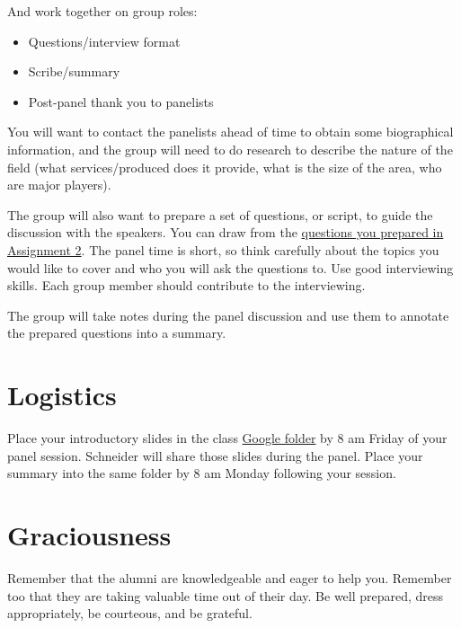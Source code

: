 \documentclass[11pt]{article}
\begin{document}
And work together on group roles:
\begin{itemize}
\item Questions/interview format
\item Scribe/summary
\item Post-panel thank you to panelists
\end{itemize}

You will want to contact the panelists ahead of time to obtain some biographical information, and the group will need to do research to describe the nature of the field (what services/produced does it provide, what is the size of the area, who are major players).

The group will also want to prepare a set of questions, or script, to guide the discussion with the speakers. You can draw from the \href{https://docs.google.com/document/d/1eUqnfeW1NTqqTqEzBxjCo6u20dFwN1kRAMNXPG9ioL0/edit?usp=sharing}{questions you prepared in Assignment 2}. The panel time is short, so think carefully about the topics you would like to cover and who you will ask the questions to. Use good interviewing skills. Each group member should  contribute to the interviewing. 

The group will take notes during the panel discussion and use them to annotate the prepared questions into a summary.

\section{Logistics}
\label{sec:orgfa18aae}
Place your introductory slides in the class \href{https://drive.google.com/drive/folders/1tC6bTIxFh\_fRfUk-FdwIHLAv8rMCMje3?usp=sharing}{Google folder} by 8 am Friday of your panel session. Schneider will share those slides during the panel. Place your summary into the same folder by 8 am Monday following your session. 

\section{Graciousness}
\label{sec:orgf74d0b5}
Remember that the alumni are knowledgeable and eager to help you. Remember too that they are taking valuable time out of their day. Be well prepared, dress appropriately, be courteous, and be grateful. 
\end{document}
